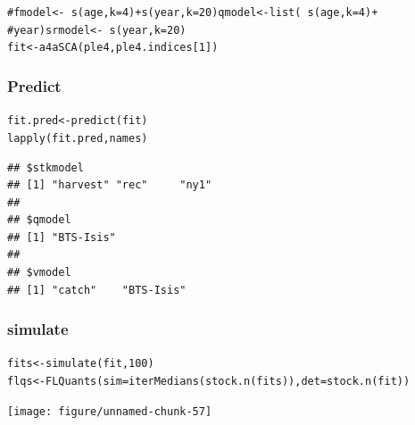 \documentclass[a4paper,english,10pt]{article}\usepackage[]{graphicx}\usepackage[]{color}
\makeatletter
\newcommand{\hlnum}[1]{\textcolor[rgb]{0.2,0.2,0.2}{#1}}%
\newcommand{\hlcom}[1]{\textcolor[rgb]{0.2,0.267,0.4}{#1}}%
\newcommand{\hlstd}[1]{\textcolor[rgb]{0,0,0}{#1}}%
\newcommand{\hlkwb}[1]{\textcolor[rgb]{0.361,0.506,0.596}{#1}}%
\newcommand{\hlkwc}[1]{\textcolor[rgb]{0.361,0.506,0.596}{#1}}%
\newcommand{\hlkwd}[1]{\textcolor[rgb]{0.361,0.506,0.596}{#1}}%
\newenvironment{kframe}{%
 \def\at@end@of@kframe{}%
 \ifinner\ifhmode%
  \def\at@end@of@kframe{\end{minipage}}%
  \begin{minipage}{\columnwidth}%
 \fi\fi%
 \def\FrameCommand##1{\hskip\@totalleftmargin \hskip-\fboxsep
 \colorbox{shadecolor}{##1}\hskip-\fboxsep
     \hskip-\linewidth \hskip-\@totalleftmargin \hskip\columnwidth}%
 \MakeFramed {\advance\hsize-\width
   \@totalleftmargin\z@ \linewidth\hsize
   \@setminipage}}%
 {\par\unskip\endMakeFramed%
 \at@end@of@kframe}
\newenvironment{knitrout}{}{} %
\makeatother
\begin{document}
\begin{knitrout}
\color{fgcolor}\begin{kframe}
\begin{alltt}
\hlcom{# fmodel <- ~ s(age, k=4) + s(year, k = 20) qmodel <- list( ~ s(age, k=4) +}
\hlcom{# year) srmodel <- ~s(year, k=20)}
\hlstd{fit} \hlkwb{<-} \hlkwd{a4aSCA}\hlstd{(ple4, ple4.indices[}\hlnum{1}\hlstd{])}
\end{alltt}
\end{kframe}
\end{knitrout}


\subsubsection{Predict}

\begin{knitrout}
\color{fgcolor}\begin{kframe}
\begin{alltt}
\hlstd{fit.pred} \hlkwb{<-} \hlkwd{predict}\hlstd{(fit)}
\hlkwd{lapply}\hlstd{(fit.pred, names)}
\end{alltt}
\begin{verbatim}
## $stkmodel
## [1] "harvest" "rec"     "ny1"    
## 
## $qmodel
## [1] "BTS-Isis"
## 
## $vmodel
## [1] "catch"    "BTS-Isis"
\end{verbatim}
\end{kframe}
\end{knitrout}


\subsubsection{simulate}

\begin{knitrout}
\color{fgcolor}\begin{kframe}
\begin{alltt}
\hlstd{fits} \hlkwb{<-} \hlkwd{simulate}\hlstd{(fit,} \hlnum{100}\hlstd{)}
\hlstd{flqs} \hlkwb{<-} \hlkwd{FLQuants}\hlstd{(}\hlkwc{sim} \hlstd{=} \hlkwd{iterMedians}\hlstd{(}\hlkwd{stock.n}\hlstd{(fits)),} \hlkwc{det} \hlstd{=} \hlkwd{stock.n}\hlstd{(fit))}
\end{alltt}
\end{kframe}
\end{knitrout}


\begin{knitrout}
\color{fgcolor}

{\centering \texttt{[image: figure/unnamed-chunk-57]} 

}



\end{knitrout}
\end{document}
